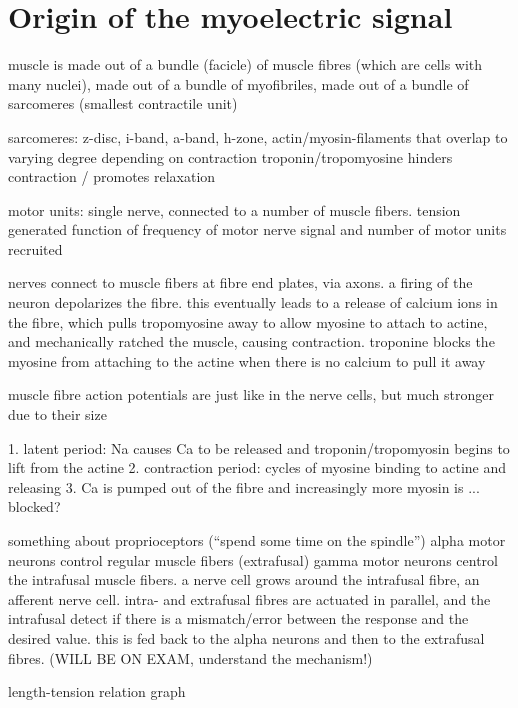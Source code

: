 \section{Origin of the myoelectric signal}

muscle is made out of a bundle (facicle) of muscle fibres (which are cells with many nuclei), made out of a bundle of myofibriles, made out of a bundle of sarcomeres (smallest contractile unit)

sarcomeres: z-disc, i-band, a-band, h-zone, actin/myosin-filaments that overlap to varying degree depending on contraction
troponin/tropomyosine hinders contraction / promotes relaxation

motor units: single nerve, connected to a number of muscle fibers. tension generated function of frequency of motor nerve signal and number of motor units recruited

nerves connect to muscle fibers at fibre end plates, via axons. a firing of the neuron depolarizes the fibre. this eventually leads to a release of calcium ions in the fibre, which pulls tropomyosine away to allow myosine to attach to actine, and mechanically ratched the muscle, causing contraction. troponine blocks the myosine from attaching to the actine when there is no calcium to pull it away

muscle fibre action potentials are just like in the nerve cells, but much stronger due to their size

1. latent period: Na causes Ca to be released and troponin/tropomyosin begins to lift from the actine
2. contraction period: cycles of myosine binding to actine and releasing
3. Ca is pumped out of the fibre and increasingly more myosin is ... blocked?

something about proprioceptors (``spend some time on the spindle'')
alpha motor neurons control regular muscle fibers (extrafusal)
gamma motor neurons centrol the intrafusal muscle fibers. a nerve cell grows around the intrafusal fibre, an afferent nerve cell. intra- and extrafusal fibres are actuated in parallel, and the intrafusal detect if there is a mismatch/error between the response and the desired value. this is fed back to the alpha neurons and then to the extrafusal fibres. (WILL BE ON EXAM, understand the mechanism!)

length-tension relation graph
